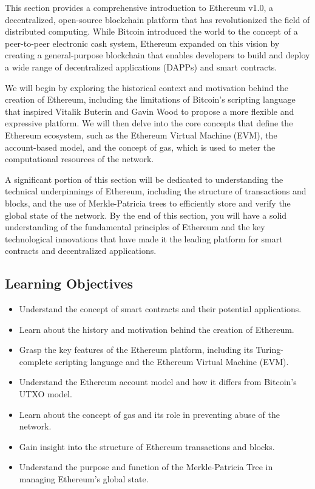 This section provides a comprehensive introduction to Ethereum v1.0, a
decentralized, open-source blockchain platform that has revolutionized
the field of distributed computing. While Bitcoin introduced the world
to the concept of a peer-to-peer electronic cash system, Ethereum
expanded on this vision by creating a general-purpose blockchain that
enables developers to build and deploy a wide range of decentralized
applications (DAPPs) and smart contracts.

We will begin by exploring the historical context and motivation behind
the creation of Ethereum, including the limitations of Bitcoin's
scripting language that inspired Vitalik Buterin and Gavin Wood to propose a more
flexible and expressive platform. We will then delve into the core
concepts that define the Ethereum ecosystem, such as the Ethereum
Virtual Machine (EVM), the account-based model, and the concept of gas,
which is used to meter the computational resources of the network.

A significant portion of this section will be dedicated to understanding
the technical underpinnings of Ethereum, including the structure of
transactions and blocks, and the use of Merkle-Patricia trees to
efficiently store and verify the global state of the network. By the end
of this section, you will have a solid understanding of the fundamental
principles of Ethereum and the key technological innovations that have
made it the leading platform for smart contracts and decentralized
applications.

\subsection{Learning Objectives}\label{learning-objectives}

\begin{itemize}
	\tightlist
	\item
	Understand the concept of smart contracts and their potential
	applications.
	\item
	Learn about the history and motivation behind the creation of
	Ethereum.
	\item
	Grasp the key features of the Ethereum platform, including its
	Turing-complete scripting language and the Ethereum Virtual Machine
	(EVM).
	\item
	Understand the Ethereum account model and how it differs from
	Bitcoin's UTXO model.
	\item
	Learn about the concept of gas and its role in preventing abuse of the
	network.
	\item
	Gain insight into the structure of Ethereum transactions and blocks.
	\item
	Understand the purpose and function of the Merkle-Patricia Tree in
	managing Ethereum's global state.
\end{itemize}

